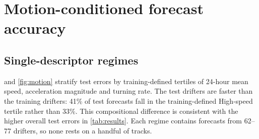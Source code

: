 \section{Motion-conditioned forecast accuracy}\label{sec:motion}

\subsection{Single-descriptor regimes}
 and \cref{fig:motion} stratify test errors by training-defined tertiles of 24-hour mean speed, acceleration magnitude and turning rate. The test drifters are faster than the training drifters: 41\% of test forecasts fall in the training-defined High-speed tertile rather than 33\%. This compositional difference is consistent with the higher overall test errors in \cref{tab:results}. Each regime contains forecasts from 62--77 drifters, so none rests on a handful of tracks.

